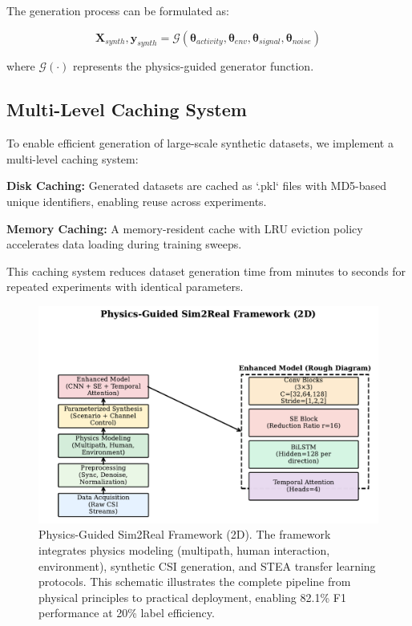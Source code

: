 \documentclass[journal]{IEEEtran}
\begin{document}
The generation process can be formulated as:

\begin{equation}
\mathbf{X}_{synth}, \mathbf{y}_{synth} = \mathcal{G}(\boldsymbol{\theta}_{activity}, \boldsymbol{\theta}_{env}, \boldsymbol{\theta}_{signal}, \boldsymbol{\theta}_{noise})
\end{equation}

where $\mathcal{G}(\cdot)$ represents the physics-guided generator function.

\subsection{Multi-Level Caching System}

To enable efficient generation of large-scale synthetic datasets, we implement a multi-level caching system:

\textbf{Disk Caching:} Generated datasets are cached as `.pkl` files with MD5-based unique identifiers, enabling reuse across experiments.

\textbf{Memory Caching:} A memory-resident cache with LRU eviction policy accelerates data loading during training sweeps.

This caching system reduces dataset generation time from minutes to seconds for repeated experiments with identical parameters.

\begin{figure}[ht]
\centering
\includegraphics[width=\columnwidth]{figures/fig2_physics_guided_framework.pdf}%
\caption{Physics-Guided Sim2Real Framework (2D). The framework integrates physics modeling (multipath, human interaction, environment), synthetic CSI generation, and STEA transfer learning protocols. This schematic illustrates the complete pipeline from physical principles to practical deployment, enabling 82.1\% F1 performance at 20\% label efficiency.}
\label{fig:physics_3d_framework}
\end{figure}
\end{document}
